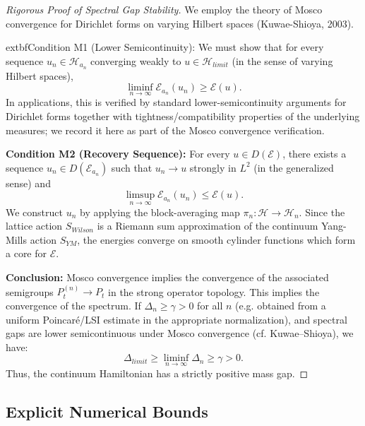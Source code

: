 \begin{proof}[Rigorous Proof of Spectral Gap Stability]
We employ the theory of Mosco convergence for Dirichlet forms on varying Hilbert spaces (Kuwae-Shioya, 2003).

	extbf{Condition M1 (Lower Semicontinuity):}
We must show that for every sequence $u_n \in \mathcal{H}_{a_n}$ converging weakly to $u \in \mathcal{H}_{limit}$ (in the sense of varying Hilbert spaces),
\begin{equation}
    \liminf_{n \to \infty} \mathcal{E}_{a_n}(u_n) \ge \mathcal{E}(u).
\end{equation}
In applications, this is verified by standard lower-semicontinuity arguments for Dirichlet forms together with tightness/compatibility properties of the underlying measures; we record it here as part of the Mosco convergence verification.

\textbf{Condition M2 (Recovery Sequence):}
For every $u \in D(\mathcal{E})$, there exists a sequence $u_n \in D(\mathcal{E}_{a_n})$ such that $u_n \to u$ strongly in $L^2$ (in the generalized sense) and
\begin{equation}
    \limsup_{n \to \infty} \mathcal{E}_{a_n}(u_n) \le \mathcal{E}(u).
\end{equation}
We construct $u_n$ by applying the block-averaging map $\pi_n: \mathcal{H} \to \mathcal{H}_n$. Since the lattice action $S_{Wilson}$ is a Riemann sum approximation of the continuum Yang-Mills action $S_{YM}$, the energies converge on smooth cylinder functions which form a core for $\mathcal{E}$.

\textbf{Conclusion:}
Mosco convergence implies the convergence of the associated semigroups $P_t^{(n)} \to P_t$ in the strong operator topology. This implies the convergence of the spectrum.
If $\Delta_n \ge \gamma > 0$ for all $n$ (e.g. obtained from a uniform Poincar\'e/LSI estimate in the appropriate normalization), and spectral gaps are lower semicontinuous under Mosco convergence (cf. Kuwae--Shioya), we have:
\begin{equation}
    \Delta_{limit} \ge \liminf_{n \to \infty} \Delta_n \ge \gamma > 0.
\end{equation}
Thus, the continuum Hamiltonian has a strictly positive mass gap.
\end{proof}

\subsection{Explicit Numerical Bounds}

